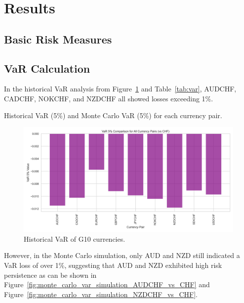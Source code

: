 \documentclass{article}
\begin{document}
\section{Results}
\subsection{Basic Risk Measures}


\subsection{VaR Calculation}
In the historical VaR analysis from Figure~\ref{fig:historical_VaR} and Table~\ref{tab:var}, AUDCHF, CADCHF, NOKCHF, and NZDCHF all showed losses exceeding 1\%. 

\begin{table}[H]
\centering
\caption{Historical VaR (5\%) and Monte Carlo VaR (5\%) for each currency pair.} 
\label{tab:var}
\end{table}

\begin{figure}[H]
    \centering   \includegraphics[width=0.75\linewidth]{reports/figures/var_5_percent_comparison_plot.png}
    \caption{Historical VaR of G10 currencies.}
    \label{fig:historical_VaR}
\end{figure}

However, in the Monte Carlo simulation, only AUD and NZD still indicated a VaR loss of over 1\%, suggesting that AUD and NZD exhibited high risk persistence as can be shown in Figure~\ref{fig:monte_carlo_var_simulation_AUDCHF_vs_CHF} and Figure~\ref{fig:monte_carlo_var_simulation_NZDCHF_vs_CHF}.
\end{document}
